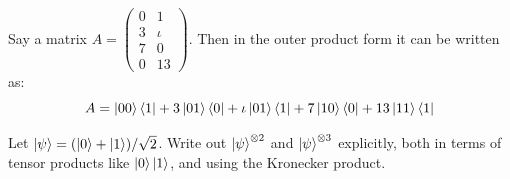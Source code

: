 \begin{example}
    Say a matrix $A=\begin{pmatrix} 0 & 1\\3 & \iota \\7 & 0\\0 & 13\end{pmatrix}$. Then in the outer product form it can be written as:
    \[ A = \ket{00}\bra{1} + 3\ket{01}\bra{0} + \iota \ket{01}\bra{1} + 7\ket{10}\bra{0} + 13 \ket{11}\bra{1}\] 
\end{example}
\begin{example}
    Let $\ket{\psi}=(\ket{0}+\ket{1})/\sqrt{2}$. Write out $\ket{\psi}^{\otimes 2}$ and $\ket{\psi}^{\otimes 3}$ explicitly, both in terms of tensor products like $\ket{0}\ket{1}$, and using the Kronecker product.


\end{example}

